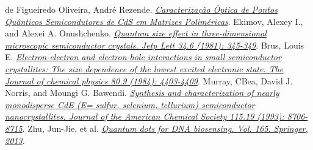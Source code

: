  de Figueiredo Oliveira, André Rezende. \href{http://www.infis.ufu.br/sites/infis.ufu.br/files/Anexos/Bookpage/TCC%20F%C3%8DSICA%20DE%20MATERIAIS%202009_2%20-%20ANDRE%20REZENDE.pdf}
\textit{Caracterização Óptica de Pontos Quânticos Semicondutores de CdS em Matrizes Poliméricas}. 
 Ekimov, Alexey I., and Alexei A. Onushchenko. \href{https://www.researchgate.net/profile/Alexey_Onushchehko/publication/234289541_Quantum_Size_Effect_in_Three-Dimensional_Microscopic_Semiconductor_Crystals/links/0c9605305fa93c4e3d000000.pdf}\textit{Quantum size effect in three-dimensional microscopic semiconductor crystals. Jetp Lett 34.6 (1981): 345-349}.
 Brus, Louis E. \href{http://aip.scitation.org/doi/10.1063/1.447218}\textit{Electron-electron and electron-hole interactions in small semiconductor crystallites: The size dependence of the lowest excited electronic state. The Journal of chemical physics 80.9 (1984): 4403-4409}.
 Murray, CBea, David J. Norris, and Moungi G. Bawendi. \href{http://pubs.acs.org/doi/abs/10.1021/ja00072a025?journalCode=jacsat}\textit{Synthesis and characterization of nearly monodisperse CdE (E= sulfur, selenium, tellurium) semiconductor nanocrystallites. Journal of the American Chemical Society 115.19 (1993): 8706-8715}.
 Zhu, Jun-Jie, et al. \href{https://link.springer.com/book/10.1007/978-3-642-44910-9}\textit{Quantum dots for DNA biosensing. Vol. 165. Springer, 2013}.

